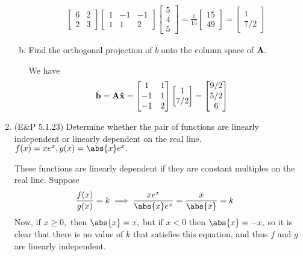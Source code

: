 \documentclass{article}
\begin{document}
\begin{enumerate}
\begin{enumerate}[(a)]
\begin{soln}
\begin{align*}
\begin{bmatrix}
							6 & 2 \\ 2 & 3
						\end{bmatrix}\begin{bmatrix}
							1 & -1 & -1 \\ 1 & 1 & 2
						\end{bmatrix}\begin{bmatrix}
							5 \\ 4 \\ 5
						\end{bmatrix} = \frac{1}{15}\begin{bmatrix}
							15 \\ 49
						\end{bmatrix} = \begin{bmatrix}
							1 \\ 7/2
						\end{bmatrix}
					\end{align*}
				\end{soln}

			\item Find the orthogonal projection of $\hat b$ onto the column space of $\bf A.$
				\begin{soln}
					We have
					\begin{align*}
						\hat{\bf b} &= \bf{A\hat x} = \begin{bmatrix}
							1 & 1 \\ -1 & 1 \\ -1 & 2
						\end{bmatrix}\begin{bmatrix}
							1 \\ 7/2
						\end{bmatrix} = \begin{bmatrix}
							9/2 \\ 5/2 \\ 6
						\end{bmatrix}
					\end{align*}
				\end{soln}

		\end{enumerate}

	\item (E\&P 5.1.23) Determine whether the pair of functions are linearly independent or linearly dependent on the real line. $f(x)=xe^x, y(x)=\abs{x}e^x.$
		\begin{soln}
			These functions are linearly dependent if they are constant multiples on the real line. Suppose
			\begin{align*}
				\frac{f(x)}{g(x)} &= k \implies \frac{xe^x}{\abs{x}e^x} = \frac{x}{\abs{x}}=k
			\end{align*}
			Now, if $x\ge 0,$ then $\abs{x}=x,$ but if $x<0$ then $\abs{x}=-x,$ so it is clear that there is no value of $k$ that satisfies this equation, and thus $f$ and $g$ are linearly independent.
		\end{soln}

\end{enumerate}
\end{document}
